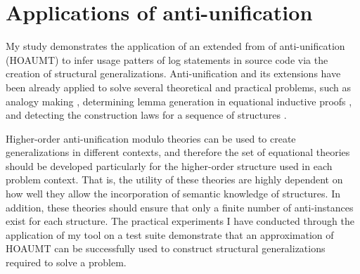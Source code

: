 \section{Applications of anti-unification}  \label{auTheory}
My study demonstrates the application of an extended from of anti-unification (HOAUMT) to infer usage patters of log statements in source code via the creation of structural generalizations. Anti-unification and its extensions have been already applied to solve several theoretical and practical problems, such as analogy making \cite{guhe2010mathematical}, determining lemma generation in equational inductive proofs \cite{2005:aij:burghardt}, and detecting the construction laws for a sequence of structures \cite{2005:aij:burghardt}.


Higher-order anti-unification modulo theories can be used to create generalizations in different contexts, and therefore the set of equational theories should be developed particularly for the higher-order structure used in each problem context. That is, the utility of these theories are highly dependent on how well they allow the incorporation of semantic knowledge of structures. In addition, these theories should ensure that only a finite number of anti-instances exist for each structure. The practical experiments I have conducted through the application of my tool on a test suite demonstrate that an approximation of HOAUMT can be successfully used to construct structural generalizations required to solve a problem.



